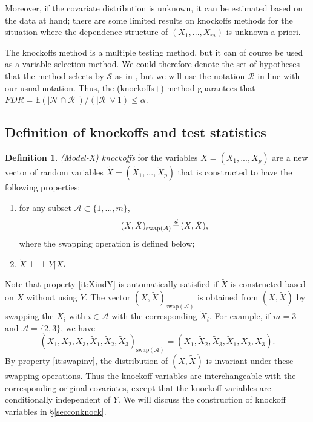 \documentclass[11pt]{article}
\theoremstyle{plain}
\theoremstyle{definition}
\newtheorem{definition}{Definition}[section]
\newcommand{\N}{\mathcal{N}}
\newcommand{\R}{\mathcal{R}}
\newcommand{\A}{\mathcal{A}}
\newcommand{\citt}{\citet}
\newcommand{\indep}{\mathrel{\perp\!\!\!\perp}}
\begin{document}
 Moreover, if the covariate distribution is unknown, it can be estimated based on the data at hand; there are some limited results on knockoffs methods for the situation where the dependence structure of $(X_1,...,X_m)$ is unknown a priori. 
 
 
 The knockoffs method is a multiple testing method, but it can of course be used as a variable selection method.  We could therefore denote the set of hypotheses that the method selects by $\mathcal{S}$ as in \citt{candes2018panning}, but we will use the notation $\R$ in line with our usual notation. Thus, the (knockoffs+) method guarantees that $FDR=\mathbb{E}(|\N\cap \R|)/(|\R|\vee 1)\leq \alpha$.
 
 \subsection{Definition of knockoffs and test statistics}
 
 \begin{definition}\label{defknockoffs} \emph{(Model-X) knockoffs} for the variables $X=(X_1,...,X_p)$ are a new vector of random variables $\tilde{X}=(\tilde{X}_1,...,\tilde{X}_p)$ that is constructed to have the following properties:
 \begin{enumerate}
 \item\label{it:swapinv} for any subset $\A\subset \{1,...,m\}$, 
 $$  (X, \tilde{X})_{\text{swap}(\A)}   \,{\buildrel d \over =}\, (X, \tilde{X}), $$ where the swapping operation is defined below;
 \item\label{it:XindY} $\tilde{X}\indep Y | X$. 
 \end{enumerate}
 \end{definition}
 Note that property \ref{it:XindY} is automatically satisfied if $\tilde{X}$ is constructed based on $X$ without using $Y$.
 The vector $(X,\tilde{X})_{\text{swap}(\A)}$ is obtained from $(X,\tilde{X})$ by swapping the $X_i$ with $i\in \A$ with the corresponding $\tilde{X}_i$. For example, if $m=3$ and $\A=\{2,3\}$, we have
 $$  (X_1,X_2,X_3,\tilde{X}_1,\tilde{X}_2,\tilde{X}_3)_{\text{swap}(\A)} =  (X_1,\tilde{X}_2,\tilde{X}_3,\tilde{X}_1,X_2,X_3).$$ By property \ref{it:swapinv},  the distribution of $(X,\tilde{X})$ is invariant under these swapping operations. Thus the knockoff variables are interchangeable with the corresponding original covariates, except that the knockoff variables  are conditionally independent of $Y$. We will discuss the construction of knockoff variables in \S\ref{secconknock}.
 
\end{document}
